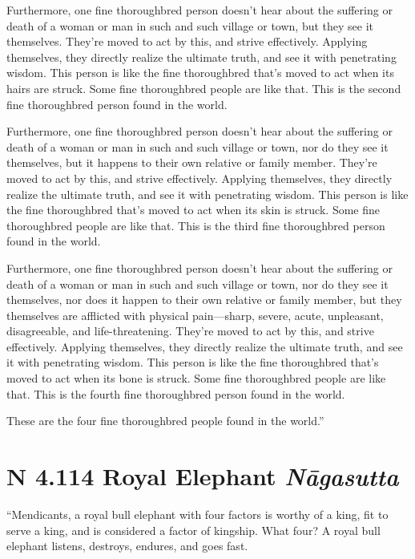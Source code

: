 \documentclass[12pt,openany]{book}%
\newcommand*{\suttatitleacronym}[1]{\smaller[2]{#1}\vspace*{.3em}}
\newcommand*{\suttatitletranslation}[1]{\linebreak{#1}}
\newcommand*{\suttatitleroot}[1]{\linebreak\smaller[2]\itshape{#1}}
\newcommand*{\tocacronym}[1]{\hspace*{-3.3em}{#1}\quad}
\newcommand*{\toctranslation}[1]{#1}
\newcommand*{\tocroot}[1]{(\textit{#1})}
\begin{document}
Furthermore, one fine thoroughbred person doesn’t hear about the suffering or death of a woman or man in such and such village or town, but they see it themselves. They’re moved to act by this, and strive effectively. Applying themselves, they directly realize the ultimate truth, and see it with penetrating wisdom. This person is like the fine thoroughbred that’s moved to act when its hairs are struck. Some fine thoroughbred people are like that. This is the second fine thoroughbred person found in the world. 

Furthermore, one fine thoroughbred person doesn’t hear about the suffering or death of a woman or man in such and such village or town, nor do they see it themselves, but it happens to their own relative or family member. They’re moved to act by this, and strive effectively. Applying themselves, they directly realize the ultimate truth, and see it with penetrating wisdom. This person is like the fine thoroughbred that’s moved to act when its skin is struck. Some fine thoroughbred people are like that. This is the third fine thoroughbred person found in the world. 

Furthermore, one fine thoroughbred person doesn’t hear about the suffering or death of a woman or man in such and such village or town, nor do they see it themselves, nor does it happen to their own relative or family member, but they themselves are afflicted with physical pain—sharp, severe, acute, unpleasant, disagreeable, and life-threatening. They’re moved to act by this, and strive effectively. Applying themselves, they directly realize the ultimate truth, and see it with penetrating wisdom. This person is like the fine thoroughbred that’s moved to act when its bone is struck. Some fine thoroughbred people are like that. This is the fourth fine thoroughbred person found in the world. 

These are the four fine thoroughbred people found in the world.” 

%
\section*{{\suttatitleacronym AN 4.114}{\suttatitletranslation A Royal Elephant }{\suttatitleroot Nāgasutta}}
\addcontentsline{toc}{section}{\tocacronym{AN 4.114} \toctranslation{A Royal Elephant } \tocroot{Nāgasutta}}

“Mendicants, a royal bull elephant with four factors is worthy of a king, fit to serve a king, and is considered a factor of kingship. What four? A royal bull elephant listens, destroys, endures, and goes fast. 
\end{document}
